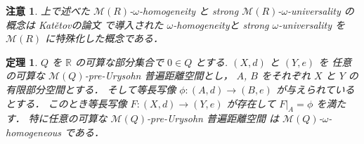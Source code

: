 \documentclass[leqno, 12pt]{jsarticle}
\newtheorem{thm}{定理}[section]
\newtheorem*{rmk}{注意}
\newcommand{\rr}{\mathbb{R}}
\begin{document}
\begin{rmk}
上で述べた
$\mathscr{M}(R)$-$\omega$-homogeneity
と
strong 
$\mathscr{M}(R)$-$\omega$-universality
の概念は 
Kat\v{e}tovの論文
 \cite{Ka}
で導入された
$\omega$-homogeneityと
strong 
$\omega$-universality
を
$\mathscr{M}(R)$
に特殊化した概念である．
\end{rmk}



\begin{thm}\label{thm:pp:doukeipre}
$Q$
を
$\rr$
の可算な部分集合で
$0\in Q$
とする. 
$(X, d)$
と
$(Y, e)$
を
任意の可算な
$\mathscr{M}(Q)$-pre-Urysohn
普遍距離空間とし，
$A$, 
$B$
をそれぞれ
$X$
と
$Y$
の有限部分空間とする．
そして等長写像
$\phi\colon (A, d)\to (B, e)$
が与えられているとする．
このとき等長写像
$F\colon (X, d)\to (Y, e)$
が存在して
$F|_{A}=\phi$
を満たす．
特に任意の可算な
$\mathscr{M}(Q)$-pre-Urysohn
普遍距離空間
は
$\mathscr{M}(Q)$-$\omega$-homogeneous
である．
\end{thm}
\end{document}
